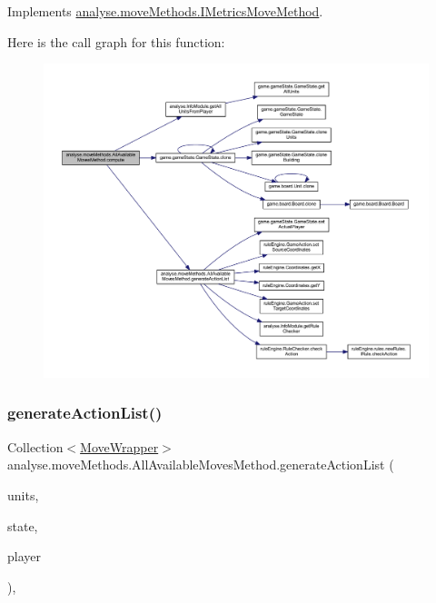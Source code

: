 Implements \mbox{\hyperlink{interfaceanalyse_1_1move_methods_1_1_i_metrics_move_method_a140fc54c9b5b634c25ea2064b4642f6f}{analyse.\+move\+Methods.\+I\+Metrics\+Move\+Method}}.

Here is the call graph for this function\+:
\nopagebreak
\begin{figure}[H]
\begin{center}
\leavevmode
\includegraphics[width=350pt]{classanalyse_1_1move_methods_1_1_all_available_moves_method_a24bb9dfcd70a39b15984b928ab46cee5_cgraph}
\end{center}
\end{figure}
\mbox{\label{classanalyse_1_1move_methods_1_1_all_available_moves_method_a1b46ec313b796fcea3764e71e5d427c9}} 
\subsubsection{\texorpdfstring{generate\+Action\+List()}{generateActionList()}}
{\footnotesize\ttfamily Collection$<$\mbox{\hyperlink{classanalyse_1_1_move_wrapper}{Move\+Wrapper}}$>$ analyse.\+move\+Methods.\+All\+Available\+Moves\+Method.\+generate\+Action\+List (\begin{DoxyParamCaption}\item[{Collection$<$ \mbox{\hyperlink{classgame_1_1board_1_1_unit}{Unit}} $>$}]{units,  }\item[{\mbox{\hyperlink{classgame_1_1game_state_1_1_game_state}{Game\+State}}}]{state,  }\item[{\mbox{\hyperlink{enumgame_1_1_e_player}{E\+Player}}}]{player }\end{DoxyParamCaption})\hspace{0.3cm}{\ttfamily [inline]}, {\ttfamily [private]}}

